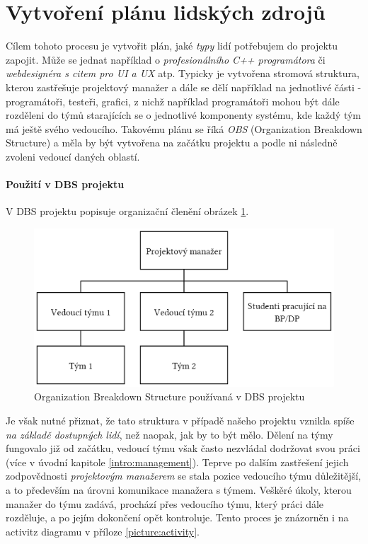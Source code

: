 
\section{Vytvoření plánu lidských zdrojů}

Cílem tohoto procesu je vytvořit plán, jaké \emph{typy} lidí potřebujem do projektu zapojit. Může se jednat například o \emph{profesionálního C++ programátora} či \emph{webdesignéra s citem pro UI a UX} atp. Typicky je vytvořena stromová struktura, kterou zastřešuje projektový manažer a dále se dělí například na jednotlivé části - programátoři, testeři, grafici, z nichž například programátoři mohou být dále rozděleni do týmů starajících se o jednotlivé komponenty systému, kde každý tým má ještě svého vedoucího. Takovému plánu se říká \emph{OBS} (Organization Breakdown Structure) a měla by být vytvořena na začátku projektu a podle ni následně zvoleni vedoucí daných oblastí.

\paragraph{Použití v DBS projektu}
V DBS projektu popisuje organizační členění obrázek \ref{picture:obs}.\\
\begin{figure}[h]
\includegraphics[width=\textwidth]{../pdf/dbs-obs.pdf}
\caption{Organization Breakdown Structure používaná v DBS projektu} \label{picture:obs}
\end{figure}
Je však nutné přiznat, že tato struktura v případě našeho projektu vznikla spíše \emph{na základě dostupných lidí}, než naopak, jak by to být mělo. Dělení na týmy fungovalo již od začátku, vedoucí týmu však často nezvládal dodržovat svou práci (více v úvodní kapitole \ref{intro:management}). Teprve po dalším zastřešení jejich zodpovědnosti \emph{projektovým manažerem} se stala pozice vedoucího týmu důležitější, a to především na úrovni komunikace manažera s týmem. Veškěré úkoly, kterou manažer do týmu zadává, prochází přes vedoucího týmu, který práci dále rozděluje, a po jejím dokončení opět kontroluje. Tento proces je znázorněn i na activitz diagramu v příloze \ref{picture:activity}.

